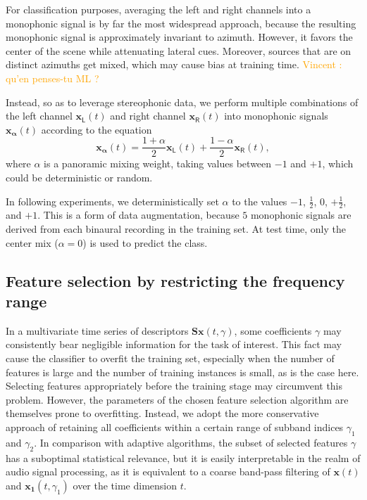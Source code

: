 \documentclass[journal]{IEEEtran}
\newcommand{\vl}[1]{\textcolor{orange}{Vincent : #1}}
\begin{document}
For classification purposes, averaging the left and right channels into a monophonic signal is by far the most widespread approach, because the resulting monophonic signal is approximately invariant to azimuth.
However, it favors the center of the scene while attenuating lateral cues.
Moreover, sources that are on distinct azimuths get mixed, which may cause bias at training time.
\vl{qu'en penses-tu ML ?}

Instead, so as to leverage stereophonic data, we perform multiple combinations of the left channel $\boldsymbol{x_{\mathsf{L}}}(t)$ and right channel $\boldsymbol{x_{\mathsf{R}}}(t)$ into monophonic signals $\boldsymbol{x_{\alpha}}(t)$ according to the equation
\begin{equation}
\boldsymbol{x_{\alpha}}(t) =
\dfrac{1+\alpha}{2} \boldsymbol{x_\mathsf{L}}(t) +
\dfrac{1-\alpha}{2} \boldsymbol{x_\mathsf{R}}(t),
\end{equation}
where $\alpha$ is a panoramic mixing weight, taking values between $-1$ and $+1$, which could be deterministic or random.

In following experiments, we deterministically set $\alpha$ to the values $-1$, $\frac{1}{2}$, $0$, $+\frac{1}{2}$, and $+1$.
This is a form of data augmentation, because $5$ monophonic signals are derived from each binaural recording in the training set.
At test time, only the center mix ($\alpha = 0$) is used to predict the class.

\subsection{Feature selection by restricting the frequency range}
In a multivariate time series of descriptors $\mathbf{S}\boldsymbol{x}(t,\gamma)$, some coefficients $\gamma$ may consistently bear negligible information for the task of interest.
This fact may cause the classifier to overfit the training set, especially when the number of features is large and the number of training instances is small, as is the case here.
Selecting features appropriately before the training stage may circumvent this problem.
However, the parameters of the chosen feature selection algorithm are themselves prone to overfitting.
Instead, we adopt the more conservative approach of retaining all coefficients within a certain range of subband indices $\gamma_1$ and $\gamma_2$.
In comparison with adaptive algorithms, the subset of selected features $\gamma$ has a suboptimal statistical relevance, but it is easily interpretable in the realm of audio signal processing, as it is equivalent to a coarse band-pass filtering of $\boldsymbol{x}(t)$ and $\boldsymbol{x_1}(t,\gamma_1)$ over the time dimension $t$.
\end{document}

